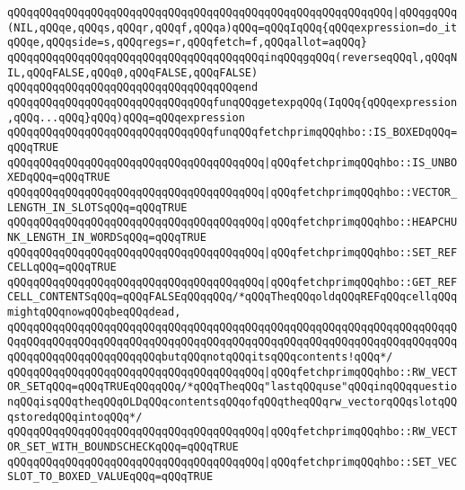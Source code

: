 \verb|qQQqqQQqqQQqqQQqqQQqqQQqqQQqqQQqqQQqqQQqqQQqqQQqqQQqqQQqqQQq|\verb#|qQQqgqQQq(NIL,qQQqe,qQQqs,qQQqr,qQQqf,qQQqa)qQQq=qQQqIqQQq{qQQqexpression=do_itqQQqe,qQQqside=s,qQQqregs=r,qQQqfetch=f,qQQqallot=aqQQq}#\newline
\verb|qQQqqQQqqQQqqQQqqQQqqQQqqQQqqQQqqQQqqQQqinqQQqgqQQq(reverseqQQql,qQQqNIL,qQQqFALSE,qQQq0,qQQqFALSE,qQQqFALSE)|\newline
\verb|qQQqqQQqqQQqqQQqqQQqqQQqqQQqqQQqqQQqend|\newline
\newline
\verb|qQQqqQQqqQQqqQQqqQQqqQQqqQQqqQQqfunqQQqgetexpqQQq(IqQQq{qQQqexpression,qQQq...qQQq}qQQq)qQQq=qQQqexpression|\newline
\newline
\verb|qQQqqQQqqQQqqQQqqQQqqQQqqQQqqQQqfunqQQqfetchprimqQQqhbo::IS_BOXEDqQQq=qQQqTRUE|\newline
\verb|qQQqqQQqqQQqqQQqqQQqqQQqqQQqqQQqqQQqqQQq|\verb#|qQQqfetchprimqQQqhbo::IS_UNBOXEDqQQq=qQQqTRUE#\newline
\verb|qQQqqQQqqQQqqQQqqQQqqQQqqQQqqQQqqQQqqQQq|\verb#|qQQqfetchprimqQQqhbo::VECTOR_LENGTH_IN_SLOTSqQQq=qQQqTRUE#\newline
\verb|qQQqqQQqqQQqqQQqqQQqqQQqqQQqqQQqqQQqqQQq|\verb#|qQQqfetchprimqQQqhbo::HEAPCHUNK_LENGTH_IN_WORDSqQQq=qQQqTRUE#\newline
\verb|qQQqqQQqqQQqqQQqqQQqqQQqqQQqqQQqqQQqqQQq|\verb#|qQQqfetchprimqQQqhbo::SET_REFCELLqQQq=qQQqTRUE#\newline
\verb|qQQqqQQqqQQqqQQqqQQqqQQqqQQqqQQqqQQqqQQq|\verb#|qQQqfetchprimqQQqhbo::GET_REFCELL_CONTENTSqQQq=qQQqFALSEqQQqqQQq/*qQQqTheqQQqoldqQQqREFqQQqcellqQQqmightqQQqnowqQQqbeqQQqdead,#\newline
\verb|qQQqqQQqqQQqqQQqqQQqqQQqqQQqqQQqqQQqqQQqqQQqqQQqqQQqqQQqqQQqqQQqqQQqqQQqqQQqqQQqqQQqqQQqqQQqqQQqqQQqqQQqqQQqqQQqqQQqqQQqqQQqqQQqqQQqqQQqqQQqqQQqqQQqqQQqqQQqqQQqqQQqbutqQQqnotqQQqitsqQQqcontents!qQQq*/|\newline
\verb|qQQqqQQqqQQqqQQqqQQqqQQqqQQqqQQqqQQqqQQq|\verb#|qQQqfetchprimqQQqhbo::RW_VECTOR_SETqQQq=qQQqTRUEqQQqqQQq/*qQQqTheqQQq"lastqQQquse"qQQqinqQQqquestionqQQqisqQQqtheqQQqOLDqQQqcontentsqQQqofqQQqtheqQQqrw_vectorqQQqslotqQQqstoredqQQqintoqQQq*/#\newline
\newline
\verb|qQQqqQQqqQQqqQQqqQQqqQQqqQQqqQQqqQQqqQQq|\verb#|qQQqfetchprimqQQqhbo::RW_VECTOR_SET_WITH_BOUNDSCHECKqQQq=qQQqTRUE#\newline
\verb|qQQqqQQqqQQqqQQqqQQqqQQqqQQqqQQqqQQqqQQq|\verb#|qQQqfetchprimqQQqhbo::SET_VECSLOT_TO_BOXED_VALUEqQQq=qQQqTRUE#\newline
